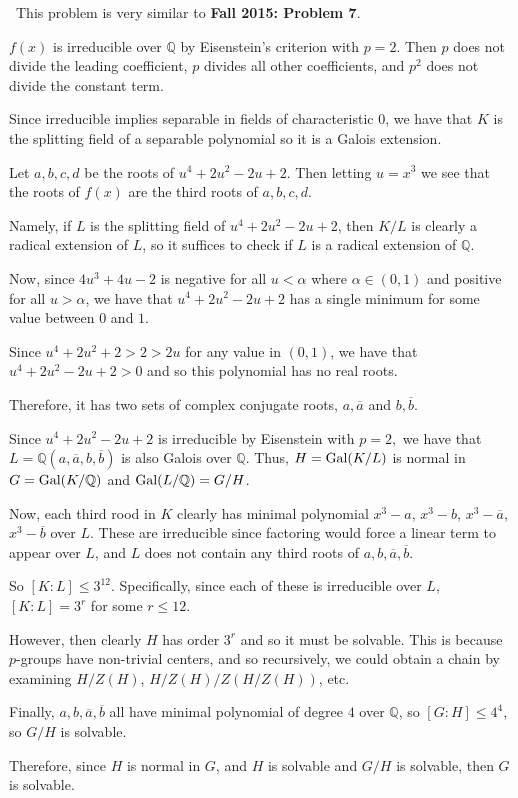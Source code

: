 \documentclass[12pt]{Qual}
\begin{document}
\begin{solution}$\,$
This problem is very similar to \textbf{Fall 2015: Problem 7}.

$f(x)$ is irreducible over $\mathbb{Q}$ by Eisenstein's criterion with $p=2$. Then $p$ does not divide the leading coefficient, $p$ divides all other coefficients, and $p^2$ does not divide the constant term.

Since irreducible implies separable in fields of characteristic $0$, we have that $K$ is the splitting field of a separable polynomial so it is a Galois extension.

Let $a,b,c,d$ be the roots of $u^4+2u^2-2u+2$. Then letting $u=x^3$ we see that the roots of $f(x)$ are the third roots of $a,b,c,d$.

Namely, if $L$ is the splitting field of $u^4+2u^2-2u+2$, then $K/L$ is clearly a radical extension of $L$, so it suffices to check if $L$ is a radical extension of $\mathbb{Q}$.

Now, since $4u^3+4u-2$ is negative for all $u<\alpha$ where $\alpha\in(0,1)$ and positive for all $u>\alpha$, we have that $u^4+2u^2-2u+2$ has a single minimum for some value between $0$ and $1$.

Since $u^4+2u^2+2>2>2u$ for any value in $(0,1)$, we have that $u^4+2u^2-2u+2>0$ and so this polynomial has no real roots.

Therefore, it has two sets of complex conjugate roots, $a,\overline{a}$ and $b,\overline{b}$.

Since $u^4+2u^2-2u+2$ is irreducible by Eisenstein with $p=2,$ we have that $L=\mathbb{Q}(a,\overline{a},b,\overline{b})$ is also Galois over $\mathbb{Q}$. Thus, $H=\text{Gal}(K/L)$ is normal in $G=\text{Gal}(K/\mathbb{Q})$ and $\text{Gal}(L/\mathbb{Q})=G/H$.

Now, each third rood in $K$ clearly has minimal polynomial $x^3-a$, $x^3-b$, $x^3-\overline{a}$, $x^3-\overline{b}$ over $L$. These are irreducible since factoring would force a linear term to appear over $L$, and $L$ does not contain any third roots of $a,b,\overline{a},\overline{b}$.

So $[K:L]\le 3^{12}$. Specifically, since each of these is irreducible over $L$, $[K:L]=3^r$ for some $r\le12$.

However, then clearly $H$ has order $3^r$ and so it must be solvable. This is because $p$-groups have non-trivial centers, and so recursively, we could obtain a chain by examining $H/Z(H)$, $H/Z(H)/Z(H/Z(H))$, etc.

Finally, $a,b,\overline{a}, \overline{b}$ all have minimal polynomial of degree $4$ over $\mathbb{Q}$, so $[G:H]\le 4^4$, so $G/H$ is solvable.

Therefore, since $H$ is normal in $G$, and $H$ is solvable and $G/H$ is solvable, then $G$ is solvable.
\end{solution}
\newpage
\end{document}
